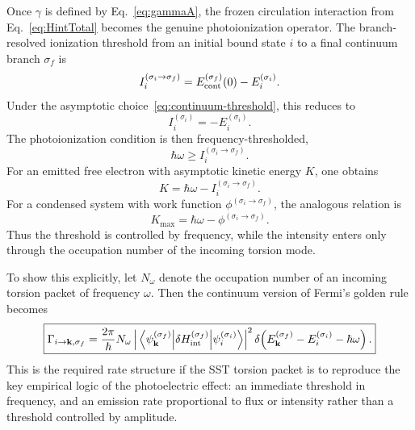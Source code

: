 \documentclass[11pt,a4paper]{article}
\begin{document}
Once $\gamma$ is defined by Eq.~\eqref{eq:gammaA}, the frozen circulation interaction from Eq.~\eqref{eq:HintTotal} becomes the genuine photoionization operator. The branch-resolved ionization threshold from an initial bound state $i$ to a final continuum branch $\sigma_f$ is
\begin{equation}
\label{eq:IonizationThresholdGeneral}
I_i^{(\sigma_i\to \sigma_f)}
=
E_{\rm cont}^{(\sigma_f)}(0)-E_i^{(\sigma_i)}.
\end{equation}
Under the asymptotic choice~\eqref{eq:continuum-threshold}, this reduces to
\begin{equation}
\label{eq:IonizationThresholdSimple}
I_i^{(\sigma_i)}=-E_i^{(\sigma_i)}.
\end{equation}
The photoionization condition is then frequency-thresholded,
\begin{equation}
\label{eq:PhotoThreshold}
\boxed{
\hbar\omega \ge I_i^{(\sigma_i\to \sigma_f)}.
}
\end{equation}
For an emitted free electron with asymptotic kinetic energy $K$, one obtains
\begin{equation}
\label{eq:KineticEnergyAtom}
\boxed{
K
=
\hbar\omega - I_i^{(\sigma_i\to \sigma_f)}.
}
\end{equation}
For a condensed system with work function $\phi^{(\sigma_i\to \sigma_f)}$, the analogous relation is
\begin{equation}
\label{eq:PhotoelectricSolid}
\boxed{
K_{\max}
=
\hbar\omega - \phi^{(\sigma_i\to \sigma_f)}.
}
\end{equation}
Thus the threshold is controlled by frequency, while the intensity enters only through the occupation number of the incoming torsion mode.

To show this explicitly, let $N_\omega$ denote the occupation number of an incoming torsion packet of frequency $\omega$. Then the continuum version of Fermi's golden rule becomes
\begin{equation}
\label{eq:GoldenRuleContinuum}
\boxed{
\Gamma_{i\to \mathbf k,\sigma_f}
=
\frac{2\pi}{\hbar}
N_\omega
\left|
\matrixel{\psi_{\mathbf k}^{(\sigma_f)}}{\delta H_{\rm int}^{(\sigma_f)}}{\psi_i^{(\sigma_i)}}
\right|^2
\delta\!\left(
E_{\mathbf k}^{(\sigma_f)}-E_i^{(\sigma_i)}-\hbar\omega
\right).
}
\end{equation}
This is the required rate structure if the SST torsion packet is to reproduce the key empirical logic of the photoelectric effect: an immediate threshold in frequency, and an emission rate proportional to flux or intensity rather than a threshold controlled by amplitude.
\end{document}
